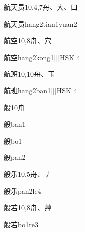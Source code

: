 \begin{entry}{航天员}{10,4,7}{⾈、⼤、⼝}
  \begin{phonetics}{航天员}{hang2tian1yuan2}
  \end{phonetics}
\end{entry}

\begin{entry}{航空}{10,8}{⾈、⽳}
  \begin{phonetics}{航空}{hang2kong1}[][HSK 4]
  \end{phonetics}
\end{entry}

\begin{entry}{航班}{10,10}{⾈、⽟}
  \begin{phonetics}{航班}{hang2ban1}[][HSK 4]
  \end{phonetics}
\end{entry}

\begin{entry}{般}{10}{⾈}
  \begin{phonetics}{般}{ban1}
  \end{phonetics}
  \begin{phonetics}{般}{bo1}
  \end{phonetics}
  \begin{phonetics}{般}{pan2}
  \end{phonetics}
\end{entry}

\begin{entry}{般乐}{10,5}{⾈、⼃}
  \begin{phonetics}{般乐}{pan2le4}
  \end{phonetics}
\end{entry}

\begin{entry}{般若}{10,8}{⾈、⾋}
  \begin{phonetics}{般若}{bo1re3}
  \end{phonetics}
\end{entry}

